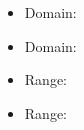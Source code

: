 \documentclass{article}
\begin{document}
\vspace{0.1cm}
\begin{multicols}{2}
    \begin{itemize}
        \item Domain: \makebox[2in]{\hrulefill}
        \item Domain: \makebox[2in]{\hrulefill}
    \end{itemize}
\end{multicols}
\vspace{0.1cm}
\begin{multicols}{2}
    \begin{itemize}
        \item Range: \makebox[2in]{\hrulefill}
        \item Range: \makebox[2in]{\hrulefill}
    \end{itemize}
\end{multicols}
\end{document}
